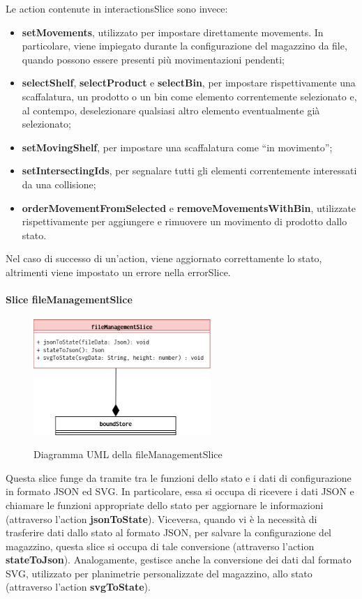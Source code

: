 \noindent Le action contenute in interactionsSlice sono invece:
\begin{itemize}
    \item \textbf{setMovements}, utilizzato per impostare direttamente movements. In particolare, viene impiegato durante la configurazione del magazzino da file, quando possono essere presenti più movimentazioni pendenti;
    \item \textbf{selectShelf}, \textbf{selectProduct} e \textbf{selectBin}, per impostare rispettivamente una scaffalatura, un prodotto o un bin come elemento correntemente selezionato e, al contempo, deselezionare qualsiasi altro elemento eventualmente già selezionato;
    \item \textbf{setMovingShelf}, per impostare una scaffalatura come ``in movimento'';
    \item \textbf{setIntersectingIds}, per segnalare tutti gli elementi correntemente interessati da una collisione;
    \item \textbf{orderMovementFromSelected} e \textbf{removeMovementsWithBin},  utilizzate rispettivamente per aggiungere e rimuovere un movimento di prodotto dallo stato.
\end{itemize}
Nel caso di successo di un'action, viene aggiornato correttamente lo stato, altrimenti viene impostato un errore nella errorSlice.

\paragraph{Slice fileManagementSlice}
\begin{figure}[H]
    \centering
    \includegraphics[width=0.6\textwidth]{images/UML/feature_model_fileManagement.drawio.png}
    \label{fig:UML_fileManagementSlice}
    \caption{Diagramma UML della fileManagementSlice}
\end{figure}
Questa slice funge da tramite tra le funzioni dello stato e i dati di configurazione in formato JSON ed SVG. In particolare, essa si occupa di ricevere i dati JSON e chiamare le funzioni appropriate dello stato per aggiornare le informazioni (attraverso l'action \textbf{jsonToState}). Viceversa, quando vi è la necessità di trasferire dati dallo stato al formato JSON, per salvare la configurazione del magazzino, questa slice si occupa di tale conversione (attraverso l'action \textbf{stateToJson}). Analogamente, gestisce anche la conversione dei dati dal formato SVG, utilizzato per planimetrie personalizzate del magazzino, allo stato (attraverso l'action \textbf{svgToState}).

